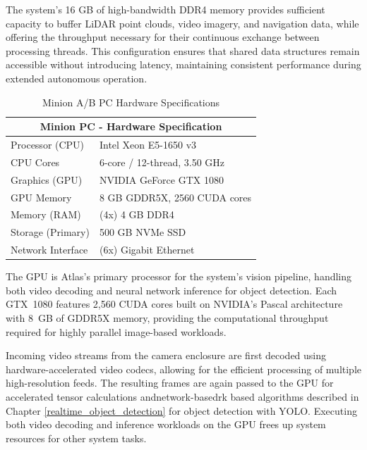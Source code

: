 \documentclass{erauthesis}
\begin{document}
The system’s 16 GB of high-bandwidth DDR4 memory provides sufficient capacity to buffer LiDAR point clouds, video imagery, and navigation data, while offering the throughput necessary for their continuous exchange between processing threads.  
This configuration ensures that shared data structures remain accessible without introducing latency, maintaining consistent performance during extended autonomous operation. 

\begin{table}[htpb]
\centering
\begin{tabular}{ll}
\hline
\multicolumn{2}{c}{Minion PC - Hardware Specification} \\
\hline
\hline
Processor (CPU) & Intel Xeon E5-1650 v3 \\
CPU Cores & 6-core / 12-thread, 3.50 GHz \\
Graphics (GPU) & NVIDIA GeForce GTX 1080 \\
GPU Memory & 8 GB GDDR5X, 2560 CUDA cores \\
Memory (RAM) & (4x) 4 GB DDR4 \\
Storage (Primary) & 500 GB NVMe SSD \\
Network Interface & (6x) Gigabit Ethernet \\%
\hline
\end{tabular}
\caption{Minion A/B PC Hardware Specifications}
\label{table:Minion_hardware}
\end{table}


The GPU is Atlas's primary processor for the system’s vision pipeline, handling both video decoding and neural network inference for object detection.
Each GTX~1080 features 2,560 CUDA cores built on NVIDIA’s Pascal architecture with 8~GB of GDDR5X memory, providing the computational throughput required for highly parallel image-based workloads.  
  
Incoming video streams from the camera enclosure are first decoded using hardware-accelerated video codecs, allowing for the efficient processing of multiple high-resolution feeds.
The resulting frames are again passed to the GPU for accelerated tensor calculations andnetwork-basedrk based algorithms described in Chapter \ref{realtime_object_detection} for object detection with YOLO.
Executing both video decoding and inference workloads on the GPU frees up system resources for other system tasks.
\end{document}
